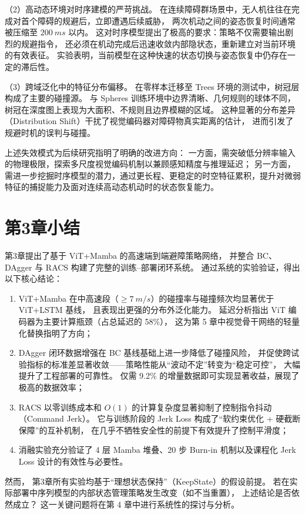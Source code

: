 （2）高动态环境对时序建模的严苛挑战。
在连续障碍群场景中，无人机往往在完成对首个障碍的规避后，立即遭遇后续威胁，
两次机动之间的姿态恢复时间通常被压缩至 $\SI{200}{ms}$ 以内。
这对时序模型提出了极高的要求：策略不仅需要输出剧烈的规避指令，
还必须在机动完成后迅速收敛内部隐状态，重新建立对当前环境的有效表征。
实验表明，当前模型在这种快速的状态切换与姿态恢复中仍存在一定的滞后性。

（3）跨域泛化中的特征分布偏移。
在零样本迁移至 Trees 环境的测试中，树冠层构成了主要的碰撞源。
与 Spheres 训练环境中边界清晰、几何规则的球体不同，
树冠在深度图上表现为大面积、不规则且边界模糊的区域。
这种显著的分布差异（Distribution Shift）干扰了视觉编码器对障碍物真实距离的估计，
进而引发了规避时机的误判与碰撞。

上述失效模式为后续研究指明了明确的改进方向：
一方面，需突破低分辨率输入的物理极限，探索多尺度视觉编码机制以兼顾感知精度与推理延迟；
另一方面，需进一步挖掘时序模型的潜力，通过更长程、更稳定的时空特征累积，提升对微弱特征的捕捉能力及面对连续高动态机动时的状态恢复能力。


\section{第3章小结}

第3章提出了基于 ViT+Mamba 的高速端到端避障策略网络，
并整合 BC、DAgger 与 RACS 构建了完整的训练--部署闭环系统。
通过系统的实验验证，得出以下核心结论：

\begin{enumerate}
  \item ViT+Mamba 在中高速段（$\geq \SI{7}{m/s}$）的碰撞率与碰撞频次均显著优于 ViT+LSTM 基线，
    且表现出更强的分布外泛化能力。
    延迟分析指出 ViT 编码器为主要计算瓶颈（占总延迟的 58\%），
    这为第 5 章中视觉骨干网络的轻量化替换指明了方向；
  \item DAgger 闭环数据增强在 BC 基线基础上进一步降低了碰撞风险，
    并促使跨试验指标的标准差显著收敛——策略性能从``波动不定''转变为``稳定可控''，
    大幅提升了工程部署的可靠性。
    仅需 9.2\% 的增量数据即可实现显著收益，展现了极高的数据效率；
  \item RACS 以零训练成本和 $O(1)$ 的计算复杂度显著抑制了控制指令抖动（Command Jerk）。
    它与训练阶段的 Jerk Loss 构成了``软约束优化 + 硬截断保障''的互补机制，
    在几乎不牺牲安全性的前提下有效提升了控制平滑度；
  \item 消融实验充分验证了 4 层 Mamba 堆叠、20 步 Burn-in 机制以及课程化 Jerk Loss 设计的有效性与必要性。
\end{enumerate}

然而，
第3章所有实验均基于``理想状态保持''（KeepState）的假设前提。
若在实际部署中序列模型的内部状态管理策略发生改变（如不当重置），
上述结论是否依然成立？
这一关键问题将在第 4 章中进行系统性的探讨与分析。
